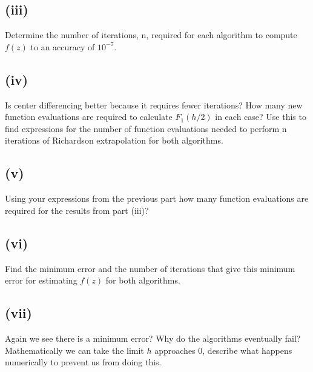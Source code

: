 \documentclass{article}
\begin{document}
\subsection*{(iii)}
Determine the number of iterations, n, required for each algorithm to compute $f(z)$ to an
accuracy of $10^{−7}$.

\vspace{60 mm}

\subsection*{(iv)}
Is center differencing better because it requires fewer iterations?  
How many new function evaluations are required to calculate $F_1(h/2)$ in each case? Use this to ﬁnd expressions for the
number of function evaluations needed to perform n iterations of Richardson extrapolation
for both algorithms.

\vspace{60 mm}

\subsection*{(v)}
Using your expressions from the previous part how many function evaluations are required
for the results from part (iii)?

\vspace{60 mm}

\subsection*{(vi)}
Find the minimum error and the number of iterations that give this minimum error for
estimating $f(z)$ for both algorithms.

\vspace{60 mm}

\subsection*{(vii)}
Again we see there is a minimum error? Why do the algorithms eventually fail? Mathematically we can take the 
limit $h$ approaches $0$, describe what happens numerically to prevent us from doing this.

\vspace{60 mm}
\end{document}
